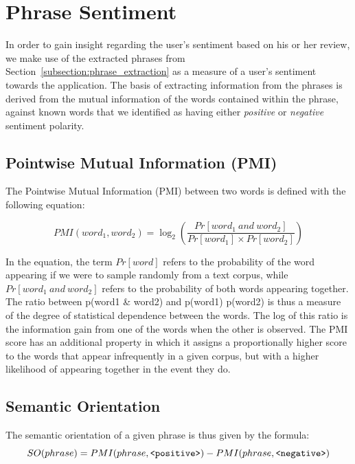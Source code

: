 \documentclass[11pt]{report} %
\begin{document}
\section{Phrase Sentiment}
\label{section:phrase_sentiment}
In order to gain insight regarding the user's sentiment based on his or her review, we make use of the extracted phrases from 
Section~\ref{subsection:phrase_extraction} as a measure of a user's sentiment towards the application. The basis of extracting information from the phrases is derived from the mutual information of the words contained within the phrase, against known words that we identified as having either \textit{positive} or \textit{negative} sentiment polarity. 

\subsection{Pointwise Mutual Information (PMI)}
The Pointwise Mutual Information (PMI) between two words \cite{church1990} is defined with the following equation:

\begin{equation*} PMI(word_1, word_2) = \log_2 \left(\frac{Pr[word_1 \: and \: word_2]}{Pr[word_1] \times Pr[word_2]}\right) \end{equation*}

In the equation, the term $Pr[word]$ refers to the probability of the word appearing if we were to sample randomly from a text corpus, while  $Pr[word_1 \: and \: word_2]$ refers to the probability of both words appearing together. The ratio between p(word1 \& word2) and p(word1) p(word2) is thus a measure of the degree of statistical dependence between the words. The log of this ratio is the information gain from one of the words when the other is observed. The PMI score has an additional property in which it assigns a proportionally higher score to the words that appear infrequently in a given corpus, but with a higher likelihood of appearing together in the event they do. \cite{Vargas2010} 

\subsection{Semantic Orientation}
The semantic orientation of a given phrase is thus given by the formula:
\begin{equation*} SO(phrase) = PMI(phrase, \verb|<positive>|) - PMI(phrase, \verb|<negative>|)\end{equation*}
\end{document}
